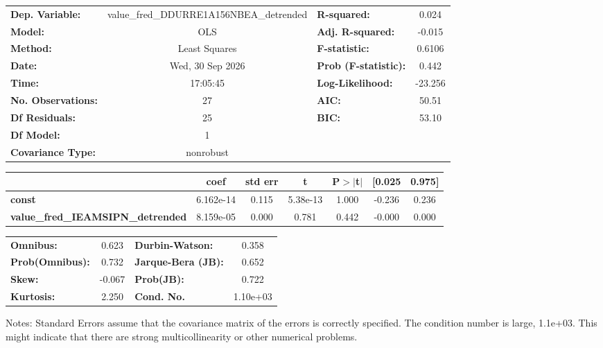 \begin{center}
\begin{tabular}{lclc}
\toprule
\textbf{Dep. Variable:}                   & value\_fred\_DDURRE1A156NBEA\_detrended & \textbf{  R-squared:         } &     0.024   \\
\textbf{Model:}                           &                   OLS                   & \textbf{  Adj. R-squared:    } &    -0.015   \\
\textbf{Method:}                          &              Least Squares              & \textbf{  F-statistic:       } &    0.6106   \\
\textbf{Date:}                            &             Wed, 30 Sep 2026            & \textbf{  Prob (F-statistic):} &    0.442    \\
\textbf{Time:}                            &                 17:05:45                & \textbf{  Log-Likelihood:    } &   -23.256   \\
\textbf{No. Observations:}                &                      27                 & \textbf{  AIC:               } &     50.51   \\
\textbf{Df Residuals:}                    &                      25                 & \textbf{  BIC:               } &     53.10   \\
\textbf{Df Model:}                        &                       1                 & \textbf{                     } &             \\
\textbf{Covariance Type:}                 &                nonrobust                & \textbf{                     } &             \\
\bottomrule
\end{tabular}
\begin{tabular}{lcccccc}
                                          & \textbf{coef} & \textbf{std err} & \textbf{t} & \textbf{P$> |$t$|$} & \textbf{[0.025} & \textbf{0.975]}  \\
\midrule
\textbf{const}                            &    6.162e-14  &        0.115     &  5.38e-13  &         1.000        &       -0.236    &        0.236     \\
\textbf{value\_fred\_IEAMSIPN\_detrended} &    8.159e-05  &        0.000     &     0.781  &         0.442        &       -0.000    &        0.000     \\
\bottomrule
\end{tabular}
\begin{tabular}{lclc}
\textbf{Omnibus:}       &  0.623 & \textbf{  Durbin-Watson:     } &    0.358  \\
\textbf{Prob(Omnibus):} &  0.732 & \textbf{  Jarque-Bera (JB):  } &    0.652  \\
\textbf{Skew:}          & -0.067 & \textbf{  Prob(JB):          } &    0.722  \\
\textbf{Kurtosis:}      &  2.250 & \textbf{  Cond. No.          } & 1.10e+03  \\
\bottomrule
\end{tabular}
\end{center}

Notes: \newline
 [1] Standard Errors assume that the covariance matrix of the errors is correctly specified. \newline
 [2] The condition number is large, 1.1e+03. This might indicate that there are \newline
 strong multicollinearity or other numerical problems.